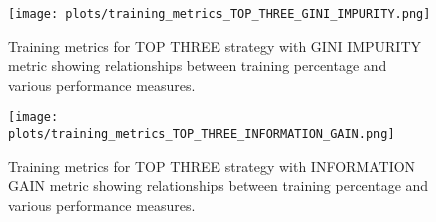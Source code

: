 \documentclass[12pt]{article}
\begin{document}
\begin{figure}[H]
    \centering
    \texttt{[image: plots/training\_metrics\_TOP\_THREE\_GINI\_IMPURITY.png]}
    \caption{Training metrics for TOP THREE strategy with GINI IMPURITY metric showing relationships between training percentage and various performance measures.}
    \label{fig:training-top3-gini}
\end{figure}
\newpage

\begin{figure}[H]
    \centering
    \texttt{[image: plots/training\_metrics\_TOP\_THREE\_INFORMATION\_GAIN.png]}
    \caption{Training metrics for TOP THREE strategy with INFORMATION GAIN metric showing relationships between training percentage and various performance measures.}
    \label{fig:training-top3-ig}
\end{figure}
\end{document}
